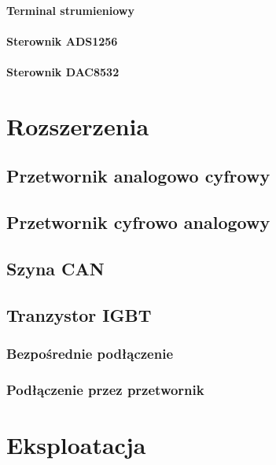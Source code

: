 \documentclass[
12pt, %
a4paper
]{report}
\begin{document}
                \subsubsection{Terminal strumieniowy}
                
                \subsubsection{Sterownik ADS1256}
                
                \subsubsection{Sterownik DAC8532}
                

	\chapter{Rozszerzenia}
	
        \section{Przetwornik analogowo cyfrowy}
        
        \section{Przetwornik cyfrowo analogowy}
        
        \section{Szyna CAN}
        
        \section{Tranzystor IGBT}
        
            \subsection{Bezpośrednie podłączenie}
            
            \subsection{Podłączenie przez przetwornik}
            
	\chapter{Eksploatacja}
	
\end{document}
